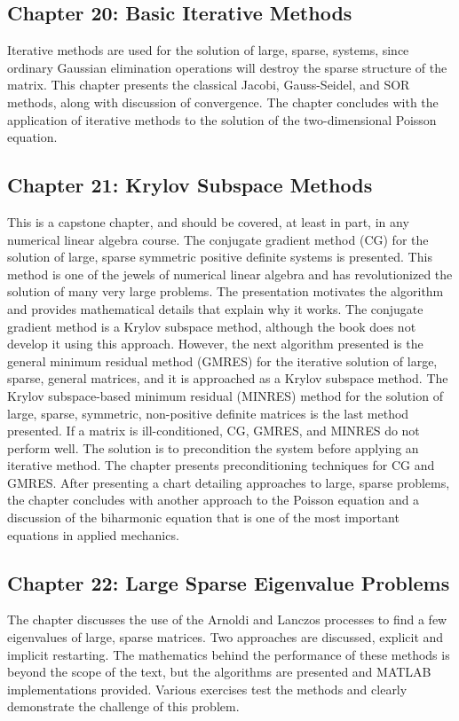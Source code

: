 \documentclass[../main.tex]{subfiles}
\begin{document}
\subsection*{Chapter 20: Basic Iterative Methods}
Iterative methods are used for the solution of large, sparse, systems, since ordinary Gaussian elimination operations will destroy the sparse structure of the matrix. This chapter presents the classical Jacobi, Gauss-Seidel, and SOR methods, along with discussion of convergence. The chapter concludes with the application of iterative methods to the solution of the two-dimensional Poisson equation.

\subsection*{Chapter 21: Krylov Subspace Methods}
This is a capstone chapter, and should be covered, at least in part, in any numerical linear algebra course. The conjugate gradient method (CG) for the solution of large, sparse symmetric positive definite systems is presented. This method is one of the jewels of numerical linear algebra and has revolutionized the solution of many very large problems. The presentation motivates the algorithm and provides mathematical details that explain why it works. The conjugate gradient method is a Krylov subspace method, although the book does not develop it using this approach. However, the next algorithm presented is the general minimum residual method (GMRES) for the iterative solution of large, sparse, general matrices, and it is approached as a Krylov subspace method. The Krylov subspace-based minimum residual (MINRES) method for the solution of large, sparse, symmetric, non-positive definite matrices is the last method presented. If a matrix is ill-conditioned, CG, GMRES, and MINRES do not perform well. The solution is to precondition the system before applying an iterative method. The chapter presents preconditioning techniques for CG and GMRES. After presenting a chart detailing approaches to large, sparse problems, the chapter concludes with another approach to the Poisson equation and a discussion of the biharmonic equation that is one of the most important equations in applied mechanics.

\subsection*{Chapter 22: Large Sparse Eigenvalue Problems}
The chapter discusses the use of the Arnoldi and Lanczos processes to find a few eigenvalues of large, sparse matrices. Two approaches are discussed, explicit and implicit restarting. The mathematics behind the performance of these methods is beyond the scope of the text, but the algorithms are presented and MATLAB implementations provided. Various exercises test the methods and clearly demonstrate the challenge of this problem.
\end{document}
